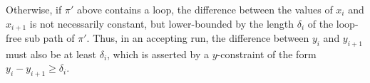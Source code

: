 Otherwise, if $\pi'$ above contains a loop, the difference between the
values of $x_i$ and $x_{i+1}$ is not necessarily constant, but
lower-bounded by the length $\delta_i$ of the loop-free sub path of
$\pi'$. Thus, in an accepting run, the difference between $y_i$ and
$y_{i+1}$ must also be at least $\delta_i$, which is asserted by a
$y$-constraint of the form $y_i-y_{i+1} \ge \delta_i$.










    
    


    
    
    
    

